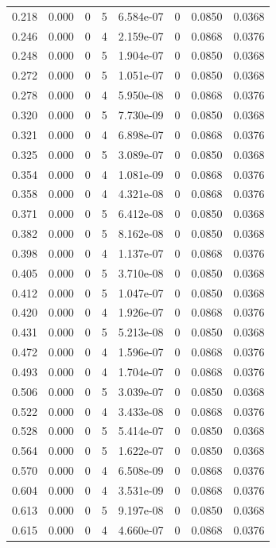 \documentclass[preview]{standalone}
\begin{document}
{{\begin{tabular}{L{1.2cm}C{1.2cm} C{0.3cm}C{0.5cm} C{1.4cm}C{1.4cm} C{1.4cm}C{1.4cm}}
  0.218  &  0.000  & 0     &  5 &  6.584e-07  & 0  & 0.0850 &  0.0368   \\ 
  0.246  &  0.000  & 0     &  4 &  2.159e-07  & 0  & 0.0868 &  0.0376   \\ 
  0.248  &  0.000  & 0     &  5 &  1.904e-07  & 0  & 0.0850 &  0.0368   \\ 
  0.272  &  0.000  & 0     &  5 &  1.051e-07  & 0  & 0.0850 &  0.0368   \\ 
  0.278  &  0.000  & 0     &  4 &  5.950e-08  & 0  & 0.0868 &  0.0376   \\ 
  0.320  &  0.000  & 0     &  5 &  7.730e-09  & 0  & 0.0850 &  0.0368   \\ 
  0.321  &  0.000  & 0     &  4 &  6.898e-07  & 0  & 0.0868 &  0.0376   \\ 
  0.325  &  0.000  & 0     &  5 &  3.089e-07  & 0  & 0.0850 &  0.0368   \\ 
  0.354  &  0.000  & 0     &  4 &  1.081e-09  & 0  & 0.0868 &  0.0376   \\ 
  0.358  &  0.000  & 0     &  4 &  4.321e-08  & 0  & 0.0868 &  0.0376   \\ 
  0.371  &  0.000  & 0     &  5 &  6.412e-08  & 0  & 0.0850 &  0.0368   \\ 
  0.382  &  0.000  & 0     &  5 &  8.162e-08  & 0  & 0.0850 &  0.0368   \\ 
  0.398  &  0.000  & 0     &  4 &  1.137e-07  & 0  & 0.0868 &  0.0376   \\ 
  0.405  &  0.000  & 0     &  5 &  3.710e-08  & 0  & 0.0850 &  0.0368   \\ 
  0.412  &  0.000  & 0     &  5 &  1.047e-07  & 0  & 0.0850 &  0.0368   \\ 
  0.420  &  0.000  & 0     &  4 &  1.926e-07  & 0  & 0.0868 &  0.0376   \\ 
  0.431  &  0.000  & 0     &  5 &  5.213e-08  & 0  & 0.0850 &  0.0368   \\ 
  0.472  &  0.000  & 0     &  4 &  1.596e-07  & 0  & 0.0868 &  0.0376   \\ 
  0.493  &  0.000  & 0     &  4 &  1.704e-07  & 0  & 0.0868 &  0.0376   \\ 
  0.506  &  0.000  & 0     &  5 &  3.039e-07  & 0  & 0.0850 &  0.0368   \\ 
  0.522  &  0.000  & 0     &  4 &  3.433e-08  & 0  & 0.0868 &  0.0376   \\ 
  0.528  &  0.000  & 0     &  5 &  5.414e-07  & 0  & 0.0850 &  0.0368   \\ 
  0.564  &  0.000  & 0     &  5 &  1.622e-07  & 0  & 0.0850 &  0.0368   \\ 
  0.570  &  0.000  & 0     &  4 &  6.508e-09  & 0  & 0.0868 &  0.0376   \\ 
  0.604  &  0.000  & 0     &  4 &  3.531e-09  & 0  & 0.0868 &  0.0376   \\ 
  0.613  &  0.000  & 0     &  5 &  9.197e-08  & 0  & 0.0850 &  0.0368   \\ 
  0.615  &  0.000  & 0     &  4 &  4.660e-07  & 0  & 0.0868 &  0.0376   \\ 
\hline 
\end{tabular} 

}}
\end{document}
